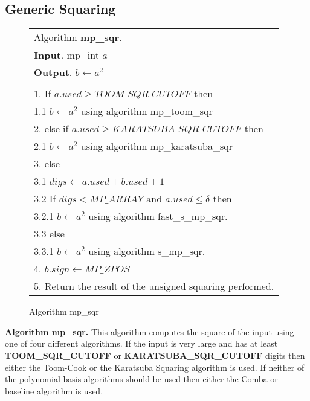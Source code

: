 \documentclass[b5paper]{book}
\begin{document}
\subsection{Generic Squaring}
\newpage\begin{figure}[!here]
\begin{small}
\begin{center}
\begin{tabular}{l}
\hline Algorithm \textbf{mp\_sqr}. \\
\textbf{Input}.   mp\_int $a$ \\
\textbf{Output}.  $b \leftarrow a^2$ \\
\hline \\
1.  If $a.used \ge TOOM\_SQR\_CUTOFF$ then  \\
\hspace{3mm}1.1  $b \leftarrow a^2$ using algorithm mp\_toom\_sqr \\
2.  else if $a.used \ge KARATSUBA\_SQR\_CUTOFF$ then \\
\hspace{3mm}2.1  $b \leftarrow a^2$ using algorithm mp\_karatsuba\_sqr \\
3.  else \\
\hspace{3mm}3.1  $digs \leftarrow a.used + b.used + 1$ \\
\hspace{3mm}3.2  If $digs < MP\_ARRAY$ and $a.used \le \delta$ then \\
\hspace{6mm}3.2.1  $b \leftarrow a^2$ using algorithm fast\_s\_mp\_sqr.  \\
\hspace{3mm}3.3  else \\
\hspace{6mm}3.3.1  $b \leftarrow a^2$ using algorithm s\_mp\_sqr.  \\
4.  $b.sign \leftarrow MP\_ZPOS$ \\
5.  Return the result of the unsigned squaring performed. \\
\hline
\end{tabular}
\end{center}
\end{small}
\caption{Algorithm mp\_sqr}
\end{figure}

\textbf{Algorithm mp\_sqr.}
This algorithm computes the square of the input using one of four different algorithms.  If the input is very large and has at least
\textbf{TOOM\_SQR\_CUTOFF} or \textbf{KARATSUBA\_SQR\_CUTOFF} digits then either the Toom-Cook or the Karatsuba Squaring algorithm is used.  If
neither of the polynomial basis algorithms should be used then either the Comba or baseline algorithm is used.  
\end{document}
